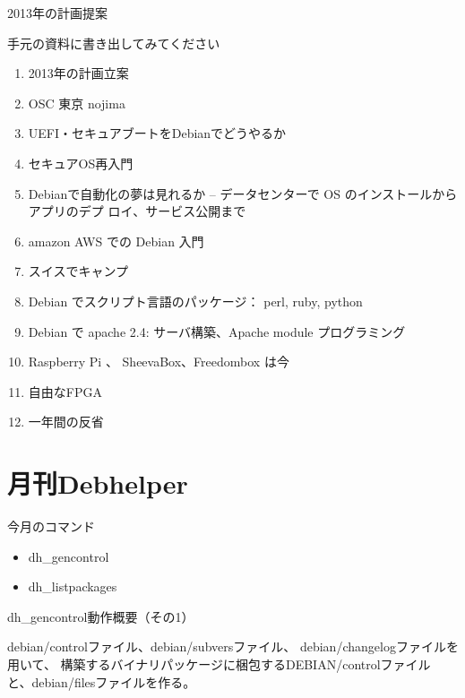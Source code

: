 \begin{frame}{2013年の計画提案}

 手元の資料に書き出してみてください 
\end{frame}

\begin{frame}%

{
\begin{enumerate}
 \item 2013年の計画立案
 \item OSC 東京 nojima 
 \item UEFI・セキュアブートをDebianでどうやるか
 \item セキュアOS再入門
 \item Debianで自動化の夢は見れるか -- データセンターで OS のインストールからアプリのデプ
       ロイ、サービス公開まで
 \item amazon AWS での Debian 入門
 \item スイスでキャンプ
 \item Debian でスクリプト言語のパッケージ： perl, ruby, python
 \item Debian で apache 2.4: サーバ構築、Apache module プログラミング
 \item Raspberry Pi 、 SheevaBox、Freedombox は今
 \item 自由なFPGA
 \item 一年間の反省
\end{enumerate}
}
\end{frame}

\section{月刊Debhelper}

\begin{frame}{今月のコマンド}
\Large
\begin{itemize}
\item dh\_gencontrol
\item dh\_listpackages
\end{itemize}

\end{frame}

\begin{frame}{dh\_gencontrol動作概要（その1）}

debian/controlファイル、debian/subversファイル、
debian/changelogファイルを用いて、
構築するバイナリパッケージに梱包するDEBIAN/controlファイル
と、debian/filesファイルを作る。

\end{frame}

